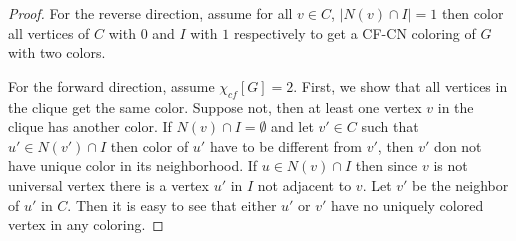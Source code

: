 \documentclass[svgnames]{llncs}
\newcommand{\cfcn}{\textsc {CF-CN}}
\begin{document}
\begin{proof}
For the reverse direction, assume for all $v \in C$, $|N(v) \cap I|=1$ then color all vertices of $C$ with $0$ and $I$ with $1$ respectively to get a \cfcn{} coloring of $G$ with two colors.

For the forward direction, assume $\chi_{cf}[G]=2$. 
First, we show that all vertices in the clique get the same color. 
Suppose not, then at least one vertex $v$ in the clique has another color.
If $N(v) \cap I = \emptyset$ and let $v'\in C$ such that $u' \in N(v') \cap I$ 
then color of $u'$ have to be different from $v'$, then $v'$ don not have unique color in its neighborhood.
If $ u \in N(v) \cap I$ then since $v$ is not universal vertex there is a vertex $u'$ in $I$ not adjacent to $v$. 
Let $v'$ be the neighbor of $u'$ in $C$. Then it is easy to see that either $u'$ or $v'$ have no uniquely colored vertex in any coloring. 


\end{proof}
\end{document}
